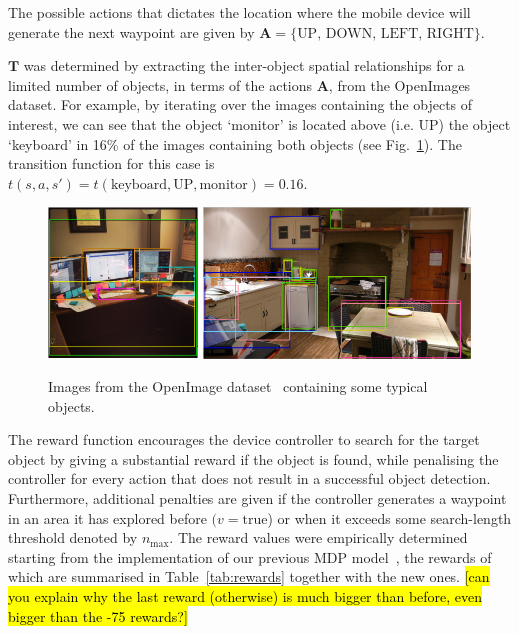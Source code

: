 \documentclass[runningheads]{llncs}
\DeclareRobustCommand{\tofix}[1]{{\sethlcolor{yellow}\hl{[#1]}}}
\begin{document}
The possible actions that dictates the location where the mobile device will generate the next waypoint are given by $\mathbf{A} = \{ \textrm{UP, DOWN, LEFT, RIGHT} \}$.

$\mathbf{T}$ was determined by extracting the inter-object spatial relationships for a limited number of objects, in terms of the actions $\mathbf{A}$, from the OpenImages~\cite{openimages} dataset. 
For example, by iterating over the images containing the objects of interest, we can see that the object `monitor' is located above (i.e. UP) the object `keyboard' in 16\% of the images containing both objects (see Fig.~\ref{fig:openimage}). 
The transition function for this case is $t(s, a, s') = t(\textrm{keyboard}, \textrm{UP}, \textrm{monitor}) = 0.16$.

\begin{figure}[t]
  \centering
  \includegraphics[height=4cm]{figures/desk_example.png} \hfil
  \includegraphics[height=4cm]{figures/kitchen_example_thicc.png}
  \caption{Images from the OpenImage dataset~\cite{openimages} containing some typical objects.}\label{fig:openimage}
\end{figure}

The reward function encourages the device controller to search for the target object by giving a substantial reward if the object is found, while penalising the controller for every action that does not result in a successful object detection.
Furthermore, additional penalties are given if the controller generates a waypoint in an area it has explored before $(v = \textrm{true}$) or when it exceeds some search-length threshold denoted by $n_{\max}$.
The reward values were empirically determined starting from the implementation of our previous MDP model~\cite{lock2019active}, the rewards of which are summarised in Table~\ref{tab:rewards} together with the new ones. \tofix{can you explain why the last reward (otherwise) is much bigger than before, even bigger than the -75 rewards?}
\end{document}
